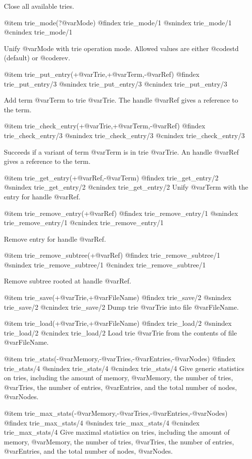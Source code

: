 {{{{{{{{{Close all available tries.

@item trie_mode(?@var{Mode})
@findex trie_mode/1
@snindex trie_mode/1
@cnindex trie_mode/1

Unify @var{Mode} with trie operation mode. Allowed values are either
@code{std} (default) or @code{rev}.

@item trie_put_entry(+@var{Trie},+@var{Term},-@var{Ref})
@findex trie_put_entry/3
@snindex trie_put_entry/3
@cnindex trie_put_entry/3

Add term @var{Term} to trie @var{Trie}. The handle @var{Ref} gives
a reference to the term.

@item trie_check_entry(+@var{Trie},+@var{Term},-@var{Ref})
@findex trie_check_entry/3
@snindex trie_check_entry/3
@cnindex trie_check_entry/3

Succeeds if a variant of term @var{Term} is in trie @var{Trie}. An handle
 @var{Ref} gives a reference to the term.

@item trie_get_entry(+@var{Ref},-@var{Term})
@findex trie_get_entry/2
@snindex trie_get_entry/2
@cnindex trie_get_entry/2
Unify @var{Term} with the entry for handle @var{Ref}.

@item trie_remove_entry(+@var{Ref})
@findex trie_remove_entry/1
@snindex trie_remove_entry/1
@cnindex trie_remove_entry/1

Remove entry for handle @var{Ref}.

@item trie_remove_subtree(+@var{Ref})
@findex trie_remove_subtree/1
@snindex trie_remove_subtree/1
@cnindex trie_remove_subtree/1

Remove subtree rooted at handle @var{Ref}.

@item trie_save(+@var{Trie},+@var{FileName})
@findex trie_save/2
@snindex trie_save/2
@cnindex trie_save/2
Dump trie @var{Trie} into file @var{FileName}.


@item trie_load(+@var{Trie},+@var{FileName})
@findex trie_load/2
@snindex trie_load/2
@cnindex trie_load/2
Load trie @var{Trie} from the contents of file @var{FileName}.

@item trie_stats(-@var{Memory},-@var{Tries},-@var{Entries},-@var{Nodes})
@findex trie_stats/4
@snindex trie_stats/4
@cnindex trie_stats/4
Give generic statistics on tries, including the amount of memory,
@var{Memory}, the number of tries, @var{Tries}, the number of entries,
@var{Entries}, and the total number of nodes, @var{Nodes}.

@item trie_max_stats(-@var{Memory},-@var{Tries},-@var{Entries},-@var{Nodes})
@findex trie_max_stats/4
@snindex trie_max_stats/4
@cnindex trie_max_stats/4
Give maximal statistics on tries, including the amount of memory,
@var{Memory}, the number of tries, @var{Tries}, the number of entries,
@var{Entries}, and the total number of nodes, @var{Nodes}.


}}}}}}}}}
